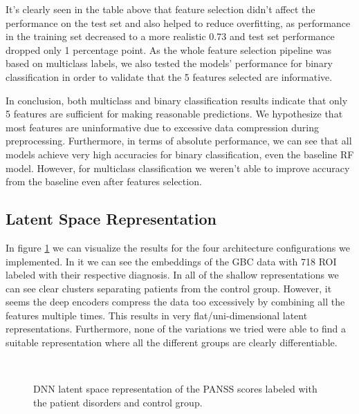 \documentclass[fleqn,moreauthors,10pt]{ds_report}
\begin{document}
It's clearly seen in the table above that feature selection didn't affect the performance on the test set and also helped to reduce overfitting, as performance in the training set decreased to a more realistic 0.73 and test set performance dropped only 1 percentage point. As the whole feature selection pipeline was based on multiclass labels, we also tested the models' performance for binary classification in order to validate that the 5 features selected are informative.

In conclusion, both multiclass and binary classification results indicate that only 5 features are sufficient for making reasonable predictions. We hypothesize that most features are uninformative due to excessive data compression during preprocessing. Furthermore, in terms of absolute performance, we can see that all models achieve very high accuracies for binary classification, even the baseline RF model. However, for multiclass classification we weren't able to improve accuracy from the baseline even after features selection.

\subsection*{Latent Space Representation}

In figure \ref{fig:latent_space_nn} we can visualize the results for the four architecture configurations we implemented. In it we can see the embeddings of the GBC data with 718 ROI labeled with their respective diagnosis. In all of the shallow representations we can see clear clusters separating patients from the control group. However, it seems the deep encoders compress the data too excessively by combining all the features multiple times. This results in very flat/uni-dimensional latent representations. Furthermore, none of the variations we tried were able to find a suitable representation where all the different groups are clearly differentiable.

\begin{figure}[h!]
    \centering
     \\
    \caption{DNN latent space representation of the PANSS scores labeled with the patient disorders and control group.}
    \label{fig:latent_space_nn}
\end{figure}
\end{document}
